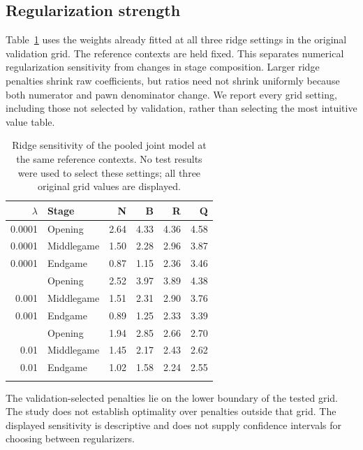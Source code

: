 \documentclass[11pt]{article}
\begin{document}
\subsection{Regularization strength}
Table~\ref{tab:ridge} uses the weights already fitted at all three ridge settings in the original validation grid. The reference contexts are held fixed. This separates numerical regularization sensitivity from changes in stage composition. Larger ridge penalties shrink raw coefficients, but ratios need not shrink uniformly because both numerator and pawn denominator change. We report every grid setting, including those not selected by validation, rather than selecting the most intuitive value table.
\begin{table}[htbp]\centering
\small
\caption{Ridge sensitivity of the pooled joint model at the same reference contexts. No test results were used to select these settings; all three original grid values are displayed.}\label{tab:ridge}
\begin{tabular}{rlrrrr}
\toprule
$\lambda$ & Stage & N & B & R & Q\\\midrule
0.0001 & Opening & 2.64 & 4.33 & 4.36 & 4.58\\
0.0001 & Middlegame & 1.50 & 2.28 & 2.96 & 3.87\\
0.0001 & Endgame & 0.87 & 1.15 & 2.36 & 3.46\\
\addlinespace
0.001 & Opening & 2.52 & 3.97 & 3.89 & 4.38\\
0.001 & Middlegame & 1.51 & 2.31 & 2.90 & 3.76\\
0.001 & Endgame & 0.89 & 1.25 & 2.33 & 3.39\\
\addlinespace
0.01 & Opening & 1.94 & 2.85 & 2.66 & 2.70\\
0.01 & Middlegame & 1.45 & 2.17 & 2.43 & 2.62\\
0.01 & Endgame & 1.02 & 1.58 & 2.24 & 2.55\\
\addlinespace
\bottomrule\end{tabular}\end{table}

The validation-selected penalties lie on the lower boundary of the tested grid. The study does not establish optimality over penalties outside that grid. The displayed sensitivity is descriptive and does not supply confidence intervals for choosing between regularizers.
\end{document}
